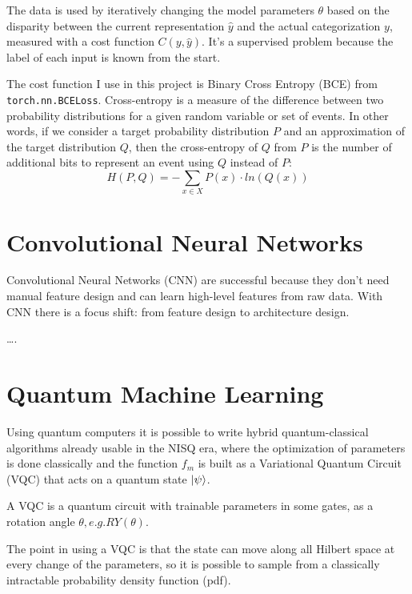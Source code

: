 \documentclass[
  13pt,
  a4paper,
  DIV=11,
  numbers=noendperiod,
  oneside]{scrreprt}
\begin{document}
The data is used by iteratively changing the model parameters \(\theta\)
based on the disparity between the current representation
\(\widehat{y}\) and the actual categorization \(y\), measured with a
cost function \(C(y, \widehat{y})\). It's a supervised problem because
the label of each input is known from the start.

The cost function I use in this project is Binary Cross Entropy (BCE)
from \texttt{torch.nn.BCELoss}. Cross-entropy is a measure of the
difference between two probability distributions for a given random
variable or set of events. In other words, if we consider a target
probability distribution \(P\) and an approximation of the target
distribution \(Q\), then the cross-entropy of \(Q\) from \(P\) is the
number of additional bits to represent an event using \(Q\) instead of
\(P\): \[
H(P,Q) = - \sum_{x \in X} P(x) \cdot ln(Q(x))
\]

\section{Convolutional Neural
Networks}\label{convolutional-neural-networks}

Convolutional Neural Networks (CNN) are successful because they don't
need manual feature design and can learn high-level features from raw
data. With CNN there is a focus shift: from feature design to
architecture design.

\ldots.

\section{Quantum Machine Learning}\label{quantum-machine-learning}

Using quantum computers it is possible to write hybrid quantum-classical
algorithms already usable in the NISQ era, where the optimization of
parameters is done classically and the function \(f_m\) is built as a
Variational Quantum Circuit (VQC) that acts on a quantum state
\(\ket{\psi}\).

A VQC is a quantum circuit with trainable parameters in some gates, as a
rotation angle \(\theta, e.g. RY(\theta)\).

The point in using a VQC is that the state can move along all Hilbert
space at every change of the parameters, so it is possible to sample
from a classically intractable probability density function (pdf).
\end{document}
